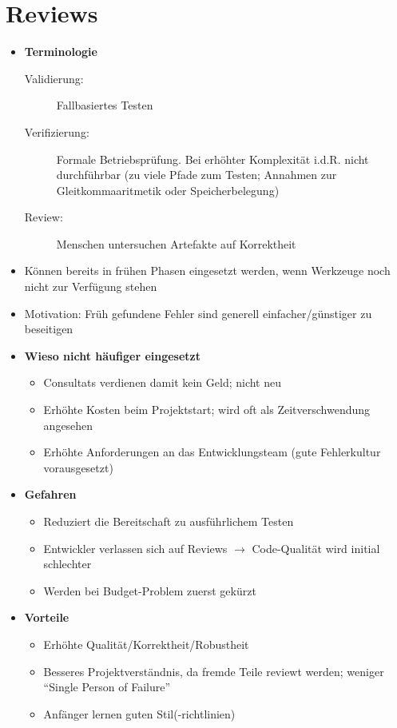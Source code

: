 \section{Reviews}
\begin{itemize}
	\item \textbf{Terminologie}
	\begin{description}
		\item[Validierung:] Fallbasiertes Testen
		\item[Verifizierung:] Formale Betriebsprüfung. Bei erhöhter Komplexität i.d.R. nicht durchführbar (zu viele Pfade zum Testen; Annahmen zur Gleitkommaaritmetik oder Speicherbelegung)
		\item[Review:] Menschen untersuchen Artefakte auf Korrektheit
	\end{description}
	\item Können bereits in frühen Phasen eingesetzt werden, wenn Werkzeuge noch nicht zur Verfügung stehen
	\item Motivation: Früh gefundene Fehler sind generell einfacher/günstiger zu beseitigen
	\item \textbf{Wieso nicht häufiger eingesetzt}
	\begin{itemize}
		\item Consultats verdienen damit kein Geld; nicht neu
		\item Erhöhte Kosten beim Projektstart; wird oft als Zeitverschwendung angesehen
		\item Erhöhte Anforderungen an das Entwicklungsteam (gute Fehlerkultur vorausgesetzt)
	\end{itemize}
	\item \textbf{Gefahren}
	\begin{itemize}
		\item Reduziert die Bereitschaft zu ausführlichem Testen
		\item Entwickler verlassen sich auf Reviews \(\rightarrow\) Code-Qualität wird initial schlechter
		\item Werden bei Budget-Problem zuerst gekürzt
	\end{itemize}
	\item \textbf{Vorteile}
	\begin{itemize}
		\item Erhöhte Qualität/Korrektheit/Robustheit
		\item Besseres Projektverständnis, da fremde Teile reviewt werden; weniger "`Single Person of Failure"'
		\item Anfänger lernen guten Stil(-richtlinien)

\end{itemize}
\end{itemize}
